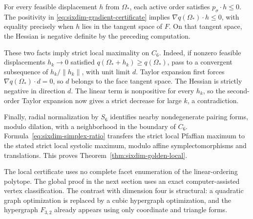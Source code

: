 For every feasible displacement $h$ from $\Omega_*$, each active order
satisfies $p_\sigma\cdot h\le0$. The positivity in
\eqref{eq:sixdim-gradient-certificate} implies
$\nabla q(\Omega_*)\cdot h\le0$, with equality precisely when $h$ lies
in the tangent space of $F$. On that tangent space, the Hessian is
negative definite by the preceding computation.

These two facts imply strict local maximality on $C_6$. Indeed, if
nonzero feasible displacements $h_k\to0$ satisfied
$q(\Omega_*+h_k)\ge q(\Omega_*)$, pass to a convergent subsequence of
$h_k/\|h_k\|$, with unit limit $d$. Taylor expansion first forces
$\nabla q(\Omega_*)\cdot d=0$, so $d$ belongs to the face tangent
space. The Hessian is strictly negative in direction $d$. The linear
term is nonpositive for every $h_k$, so the second-order Taylor expansion
now gives a strict decrease for large $k$, a contradiction.

Finally, radial normalization by $S_6$ identifies nearby nondegenerate
pairing forms, modulo dilation, with a neighborhood in the boundary of
$C_6$. Formula~\eqref{eq:sixdim-simplex-ratio} transfers the strict
local Pfaffian maximum to the stated strict local systolic maximum,
modulo affine symplectomorphisms and translations. This proves
Theorem~\ref{thm:sixdim-golden-local}.

The local certificate uses no complete facet enumeration of the
linear-ordering polytope. The global proof in the next section uses an
exact computer-assisted vertex classification. The contrast with
dimension four is structural: a quadratic graph
optimization is replaced by a cubic hypergraph optimization, and the
hypergraph $F_{3,2}$ already appears using only coordinate and triangle
forms.
